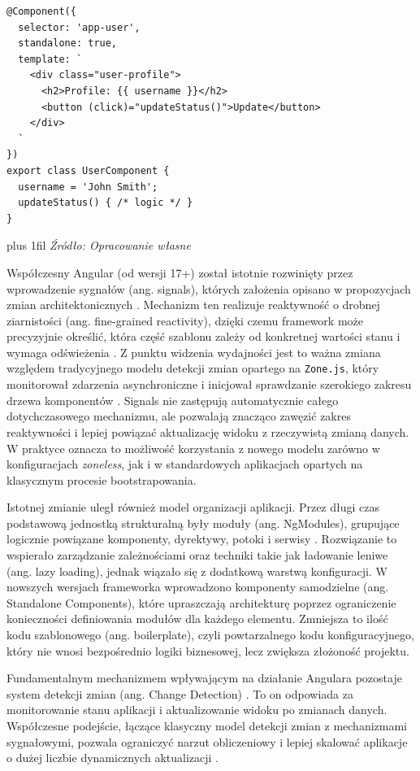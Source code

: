 \documentclass[12pt,openright,twoside]{report}
\newcommand{\source}[1]{{\par\vspace{5pt}\noindent\leftskip=0pt \rightskip=0pt \parfillskip=0pt plus 1fil \footnotesize\textit{Źródło: #1}\par}}
\begin{document}
\begin{lstlisting}[language=tsx, caption={Struktura komponentu w Angularze z wykorzystaniem dekoratora \texttt{@Component}.}, label={lst:angular-component-structure}]
@Component({
  selector: 'app-user',
  standalone: true,
  template: `
    <div class="user-profile">
      <h2>Profile: {{ username }}</h2>
      <button (click)="updateStatus()">Update</button>
    </div>
  `
})
export class UserComponent {
  username = 'John Smith';
  updateStatus() { /* logic */ }
}
\end{lstlisting}
\source{Opracowanie własne}

Współczesny Angular (od wersji 17+) został istotnie rozwinięty przez wprowadzenie sygnałów (ang. signals), których założenia opisano w propozycjach zmian architektonicznych \cite{Angular_Signals_RFC}. Mechanizm ten realizuje reaktywność o drobnej ziarnistości (ang. fine-grained reactivity), dzięki czemu framework może precyzyjnie określić, która część szablonu zależy od konkretnej wartości stanu i wymaga odświeżenia \cite{Angular_Docs}. Z punktu widzenia wydajności jest to ważna zmiana względem tradycyjnego modelu detekcji zmian opartego na \texttt{Zone.js}, który monitorował zdarzenia asynchroniczne i inicjował sprawdzanie szerokiego zakresu drzewa komponentów \cite{Angular_Development}. Signals nie zastępują automatycznie całego dotychczasowego mechanizmu, ale pozwalają znacząco zawęzić zakres reaktywności i lepiej powiązać aktualizację widoku z rzeczywistą zmianą danych. W praktyce oznacza to możliwość korzystania z nowego modelu zarówno w konfiguracjach \textit{zoneless}, jak i w standardowych aplikacjach opartych na klasycznym procesie bootstrapowania.

Istotnej zmianie uległ również model organizacji aplikacji. Przez długi czas podstawową jednostką strukturalną były moduły (ang. NgModules), grupujące logicznie powiązane komponenty, dyrektywy, potoki i serwisy \cite{Angular_Docs}. Rozwiązanie to wspierało zarządzanie zależnościami oraz techniki takie jak ładowanie leniwe (ang. lazy loading), jednak wiązało się z dodatkową warstwą konfiguracji. W nowszych wersjach frameworka wprowadzono komponenty samodzielne (ang. Standalone Components), które upraszczają architekturę poprzez ograniczenie konieczności definiowania modułów dla każdego elementu. Zmniejsza to ilość kodu szablonowego (ang. boilerplate), czyli powtarzalnego kodu konfiguracyjnego, który nie wnosi bezpośrednio logiki biznesowej, lecz zwiększa złożoność projektu.

Fundamentalnym mechanizmem wpływającym na działanie Angulara pozostaje system detekcji zmian (ang. Change Detection) \cite{Angular_Docs}. To on odpowiada za monitorowanie stanu aplikacji i aktualizowanie widoku po zmianach danych. Współczesne podejście, łączące klasyczny model detekcji zmian z mechanizmami sygnałowymi, pozwala ograniczyć narzut obliczeniowy i lepiej skalować aplikacje o dużej liczbie dynamicznych aktualizacji \cite{Learning_TS}.
\end{document}
